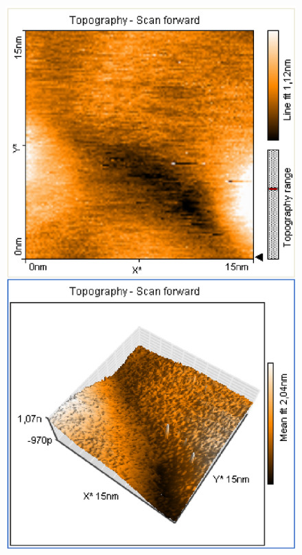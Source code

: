 \documentclass[12pt]{article}
\begin{document}
\begin{figure}[H]  
\begin{minipage}{0.4\linewidth}
\centering
\includegraphics[width=0.9\linewidth]{../plot/data/goldgitter/goldgitter7.eps}
\end{minipage}
\begin{minipage}{0.2\linewidth}
\centering
\end{minipage}
\begin{minipage}{0.4\linewidth}
\centering

\end{minipage}
\end{figure}
\end{document}
